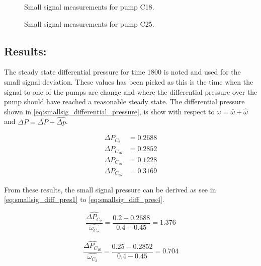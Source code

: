 \begin{figure}[H]

\caption{Small signal measurements for pump C18.}
\label{fig:small_sig_diff_press_C18}
\end{figure}

\begin{figure}[H]

\caption{Small signal measurements for pump C25.}
\label{fig:small_sig_diff_press_C25}
\end{figure}



\subsection*{Results:}
The steady state differential pressure for time 1800 is noted and used for the small signal deviation. These values has been picked as this is the time when the signal to one of the pumps are change and where the differential pressure over the pump should have reached a reasonable steady state. The differential pressure shown in \eqref{eq:smallsig_differential_pressure}, is show with respect to $\omega = \bar{\omega} + \hat{\omega}$ and $\Delta P = \bar{\Delta P} + \hat{\Delta p}$.

\begin{equation}
	\begin{split}
	\Delta P_{C_2} &= 0.2688 \\
	\Delta P_{C_{16}} &= 0.2852 \\
	\Delta P_{C_{18}} &= 0.1228 \\
	\Delta P_{C_{25}} &= 0.3169
	\end{split}
	\label{eq:smallsig_differential_pressure}
\end{equation}

From these results, the small signal pressure can be derived as see in \eqref{eq:smallsig_diff_pres1} to \eqref{eq:smallsig_diff_pres4}.

\begin{equation}
\frac{\hat{\Delta P_{C_2}}}{\hat{\omega_{C_2}}} = \frac{0.2 - 0.2688}{0.4 - 0.45} =  1.376
\label{eq:smallsig_diff_pres1}
\end{equation}

\begin{equation}
\frac{\hat{\Delta P_{C_16}}}{\hat{\omega_{C_2}}} = \frac{0.25-0.2852}{0.4-0.45} =  0.704
\label{eq:smallsig_diff_pres2}
\end{equation}

